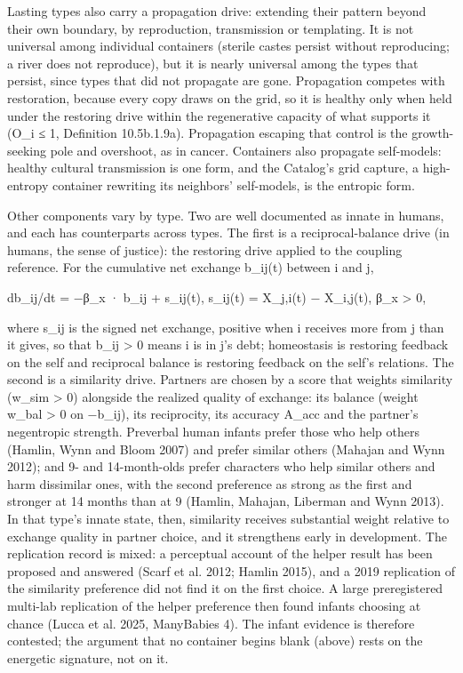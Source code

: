 \documentclass[
]{article}
\begin{document}
Lasting types also carry a propagation drive: extending their pattern
beyond their own boundary, by reproduction, transmission or templating.
It is not universal among individual containers (sterile castes persist
without reproducing; a river does not reproduce), but it is nearly
universal among the types that persist, since types that did not
propagate are gone. Propagation competes with restoration, because every
copy draws on the grid, so it is healthy only when held under the
restoring drive within the regenerative capacity of what supports it
(O\_i ≤ 1, Definition 10.5b.1.9a). Propagation escaping that control is
the growth-seeking pole and overshoot, as in cancer. Containers also
propagate self-models: healthy cultural transmission is one form, and
the Catalog's grid capture, a high-entropy container rewriting its
neighbors' self-models, is the entropic form.

Other components vary by type. Two are well documented as innate in
humans, and each has counterparts across types. The first is a
reciprocal-balance drive (in humans, the sense of justice): the
restoring drive applied to the coupling reference. For the cumulative
net exchange b\_ij(t) between i and j,

db\_ij/dt = −β\_x · b\_ij + s\_ij(t), s\_ij(t) = X\_j,i(t) − X\_i,j(t),
β\_x \textgreater{} 0,

where s\_ij is the signed net exchange, positive when i receives more
from j than it gives, so that b\_ij \textgreater{} 0 means i is in j's
debt; homeostasis is restoring feedback on the self and reciprocal
balance is restoring feedback on the self's relations. The second is a
similarity drive. Partners are chosen by a score that weights similarity
(w\_sim \textgreater{} 0) alongside the realized quality of exchange:
its balance (weight w\_bal \textgreater{} 0 on −\textbar b\_ij\textbar),
its reciprocity, its accuracy A\_acc and the partner's negentropic
strength. Preverbal human infants prefer those who help others (Hamlin,
Wynn and Bloom 2007) and prefer similar others (Mahajan and Wynn 2012);
and 9- and 14-month-olds prefer characters who help similar others and
harm dissimilar ones, with the second preference as strong as the first
and stronger at 14 months than at 9 (Hamlin, Mahajan, Liberman and Wynn
2013). In that type's innate state, then, similarity receives
substantial weight relative to exchange quality in partner choice, and
it strengthens early in development. The replication record is mixed: a
perceptual account of the helper result has been proposed and answered
(Scarf et al. 2012; Hamlin 2015), and a 2019 replication of the
similarity preference did not find it on the first choice. A large
preregistered multi-lab replication of the helper preference then found
infants choosing at chance (Lucca et al. 2025, ManyBabies 4). The infant
evidence is therefore contested; the argument that no container begins
blank (above) rests on the energetic signature, not on it.
\end{document}
